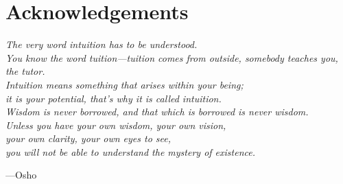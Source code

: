 
\newpage


\part*{Acknowledgements}


\newpage


\vspace*{4cm}
\begin{center}
\textit{The very word intuition has to be understood. \\[5mm]
	You know the word tuition—tuition comes from outside, somebody teaches you, the tutor. \\[5mm]
	Intuition means something that arises within your being; \\[5mm]
	it is your potential, that’s why it is called intuition. \\[5mm]
	Wisdom is never borrowed, and that which is borrowed is never wisdom. \\[5mm]
	Unless you have your own wisdom, your own vision, \\[5mm]
	your own clarity, your own eyes to see, \\[5mm]
	you will not be able to understand the mystery of existence.}
\begin{flushright}
	---Osho
\end{flushright}
\end{center}

